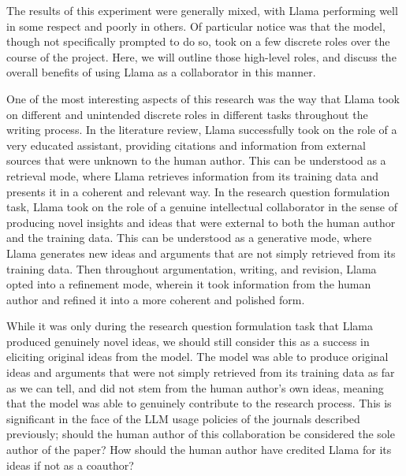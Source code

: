 The results of this experiment were generally mixed, with Llama performing well
in some respect and poorly in others. Of particular notice was that the model,
though not specifically prompted to do so, took on a few discrete roles over the
course of the project. Here, we will outline those high-level roles, and discuss
the overall benefits of using Llama as a collaborator in this manner.

One of the most interesting aspects of this research was the way that Llama took
on different and unintended discrete roles in different tasks throughout the writing
process. In the literature review, Llama successfully took on the role of a 
very educated assistant, providing citations and information from external
sources that were unknown to the human author. This can be understood as a
retrieval mode, where Llama retrieves information from its training data and
presents it in a coherent and relevant way. In the research question
formulation task, Llama took on the role of a genuine intellectual collaborator
in the sense of producing novel insights and ideas that were external to both
the human author and the training data. This can be understood as a generative
mode, where Llama generates new ideas and arguments that are not simply
retrieved from its training data. Then throughout argumentation, writing, and 
revision, Llama opted into a refinement mode, wherein it took information from
the human author and refined it into a more coherent and polished form.

While it was only during the research question formulation task that Llama
produced genuinely novel ideas, we should still consider this as a success in
eliciting original ideas from the model. The model was able to produce original
ideas and arguments that were not simply retrieved from its training data as far
as we can tell, and did not stem from the human author's own ideas, meaning that
the model was able to genuinely contribute to the research process. This is
significant in the face of the LLM usage policies of the journals described
previously; should the human author of this collaboration be considered the sole
author of the paper? How should the human author have credited Llama for its
ideas if not as a coauthor?

